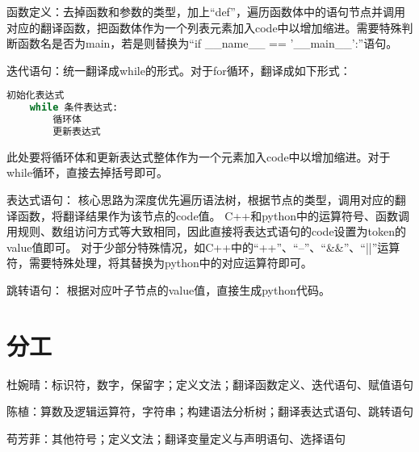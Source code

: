 \documentclass{article}
\begin{document}
函数定义：去掉函数和参数的类型，加上“def”，遍历函数体中的语句节点并调用对应的翻译函数，把函数体作为一个列表元素加入code中以增加缩进。需要特殊判断函数名是否为main，若是则替换为“if \_\_name\_\_ == '\_\_main\_\_':”语句。

迭代语句：统一翻译成while的形式。对于for循环，翻译成如下形式：
\begin{lstlisting}[language=Python]
    初始化表达式
    while 条件表达式:
        循环体
        更新表达式
\end{lstlisting}
此处要将循环体和更新表达式整体作为一个元素加入code中以增加缩进。对于while循环，直接去掉括号即可。

表达式语句：
核心思路为深度优先遍历语法树，根据节点的类型，调用对应的翻译函数，将翻译结果作为该节点的code值。
C++和python中的运算符号、函数调用规则、数组访问方式等大致相同，因此直接将表达式语句的code设置为token的value值即可。
对于少部分特殊情况，如C++中的“++”、“--”、“&&”、“||”运算符，需要特殊处理，将其替换为python中的对应运算符即可。


跳转语句：
根据对应叶子节点的value值，直接生成python代码。

\section{分工}
杜婉晴：标识符，数字，保留字；定义文法；翻译函数定义、迭代语句、赋值语句

陈植：算数及逻辑运算符，字符串；构建语法分析树；翻译表达式语句、跳转语句

苟芳菲：其他符号；定义文法；翻译变量定义与声明语句、选择语句
\end{document}
